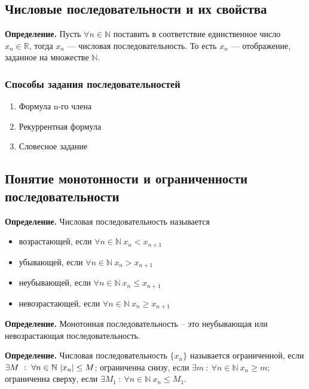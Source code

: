\documentclass{article}
\begin{document}
    \subsection{Числовые последовательности и их свойства}
    
    \textbf{Определение.} Пусть \(\forall n \in \mathbb{N}\) поставить в соответствие единственное число \(x_n \in \mathbb{R}\), тогда \(x_n\) --- числовая последовательность. То есть \(x_n\) --- отображение, заданное на множестве \(\mathbb{N}\).
    
    \subsubsection{Способы задания последовательностей}
    
    \begin{enumerate}
    	\item Формула n-го члена
        \item Рекуррентная формула
        \item Словесное задание
    \end{enumerate}
    
    \subsection{Понятие монотонности и ограниченности последовательности}
    
    \textbf{Определение.} Числовая последовательность называется
    \begin{itemize}
    	\item возрастающей, если \(\forall n \in \mathbb{N}\ x_n < x_{n+1}\)
        \item убывающей, если \(\forall n \in \mathbb{N}\ x_n > x_{n+1}\)
        \item неубывающей, если \(\forall n \in \mathbb{N}\ x_n \leq x_{n+1}\)
        \item невозрастающей, если \(\forall n \in \mathbb{N}\ x_n \geq x_{n+1}\)
  	\end{itemize}
    
    \textbf{Определение.} Монотонная последовательность – это неубывающая или невозрастающая последовательность.

    \textbf{Определение.} Числовая последовательность \(\{x_n\}\) называется ограниченной, если \(\exists M\ :\ \forall n \in \mathbb{N}\ \abs{x_n} \leq M\); ограниченна снизу, если \(\exists m\ :\ \forall n \in \mathbb{N}\ x_n \geq m\); ограниченна сверху, если \(\exists M_1\ :\ \forall n \in \mathbb{N}\ x_n \leq M_1\).
    
\end{document}
